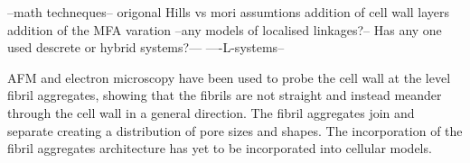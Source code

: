 --math techneques--
origonal Hills vs mori assumtions 
addition of cell wall layers
addition of the MFA varation
--any models of localised linkages?--
Has any one used descrete or hybrid systems?---
----L-systems--

AFM and electron microscopy have been used to probe the cell wall at the level fibril aggregates, showing that the fibrils are not straight and instead meander through the cell wall in a general direction. The fibril aggregates join and separate creating a distribution of pore sizes and shapes. The incorporation of the fibril aggregates architecture has yet to be incorporated into cellular models. 
